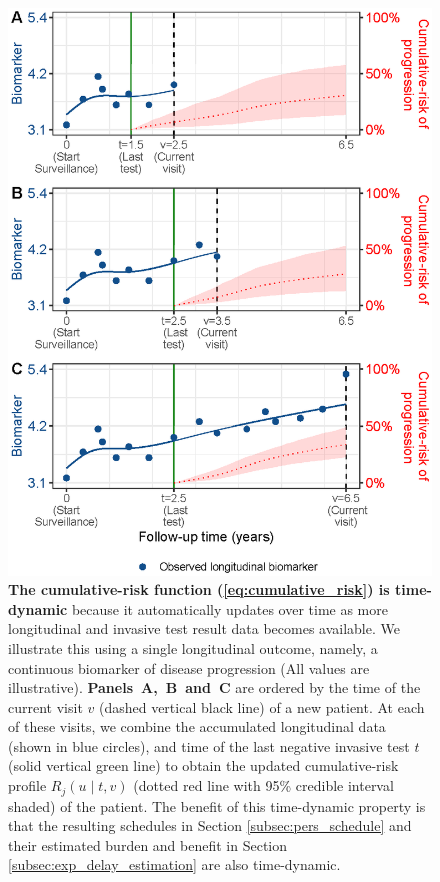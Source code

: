 \documentclass[AMA,STIX1COL]{WileyNJD-v2}
\begin{document}
\begin{figure}[!h]
\centerline{\includegraphics{figure2.eps}}
\caption{\textbf{The cumulative-risk function (\ref{eq:cumulative_risk}) is time-dynamic} because it automatically updates over time as more longitudinal and invasive test result data becomes available. We illustrate this using a single longitudinal outcome, namely, a continuous biomarker of disease progression (All values are illustrative). \textbf{Panels~A,~B~and~C} are ordered by the time of the current visit $v$ (dashed vertical black line) of a new patient. At each of these visits, we combine the accumulated longitudinal data (shown in blue circles), and time of the last negative invasive test $t$ (solid vertical green line) to obtain the updated cumulative-risk profile $R_j(u \mid t, v)$ (dotted red line with 95\% credible interval shaded) of the patient. The benefit of this time-dynamic property is that the resulting schedules in Section \ref{subsec:pers_schedule} and their estimated burden and benefit in Section \ref{subsec:exp_delay_estimation} are also time-dynamic.}
\label{fig:figure2}
\end{figure}
\end{document}
